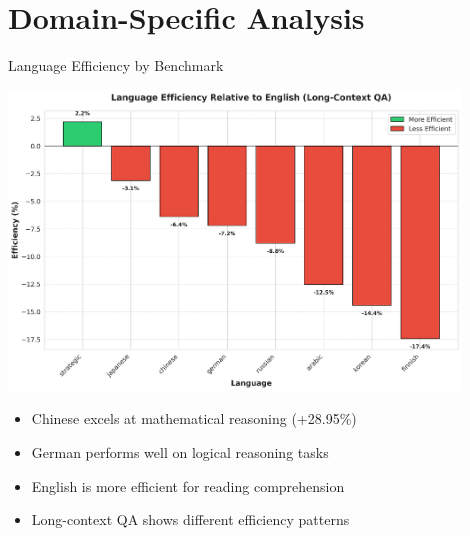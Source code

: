 \documentclass{beamer}
\begin{document}
\section{Domain-Specific Analysis}

\begin{frame}{Language Efficiency by Benchmark}
    \begin{center}
        \includegraphics[width=0.9\textwidth]{visualizations/presentation/efficiency_vs_english.png}
    \end{center}
    
    \begin{itemize}
        \item Chinese excels at mathematical reasoning (+28.95\%)
        \item German performs well on logical reasoning tasks
        \item English is more efficient for reading comprehension
        \item Long-context QA shows different efficiency patterns
    \end{itemize}
\end{frame}
\end{document}
